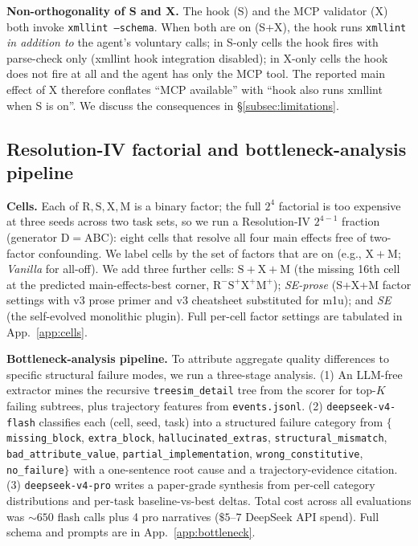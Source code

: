 \documentclass{article}
\begin{document}
\textbf{Non-orthogonality of S and X.} The hook (S) and the MCP validator (X) both invoke \texttt{xmllint --schema}. When both are on (S+X), the hook runs \texttt{xmllint} \emph{in addition to} the agent's voluntary calls; in S-only cells the hook fires with parse-check only (xmllint hook integration disabled); in X-only cells the hook does not fire at all and the agent has only the MCP tool. The reported main effect of X therefore conflates ``MCP available'' with ``hook also runs xmllint when S is on''. We discuss the consequences in \S\ref{subsec:limitations}.

\subsection{Resolution-IV factorial and bottleneck-analysis pipeline}
\label{subsec:cells}

\textbf{Cells.} Each of $\mathrm{R, S, X, M}$ is a binary factor; the full $2^4$ factorial is too expensive at three seeds across two task sets, so we run a Resolution-IV $2^{4-1}$ fraction (generator $\mathrm{D}{=}\mathrm{ABC}$): eight cells that resolve all four main effects free of two-factor confounding. We label cells by the set of factors that are on (e.g., $\mathrm{X+M}$; \emph{Vanilla} for all-off). We add three further cells: $\mathrm{S+X+M}$ (the missing 16th cell at the predicted main-effects-best corner, $\mathrm{R}^{-}\mathrm{S}^{+}\mathrm{X}^{+}\mathrm{M}^{+}$); \emph{SE-prose} (S+X+M factor settings with v3 prose primer and v3 cheatsheet substituted for m1u); and \emph{SE} (the self-evolved monolithic plugin). Full per-cell factor settings are tabulated in App.~\ref{app:cells}.

\textbf{Bottleneck-analysis pipeline.} To attribute aggregate quality differences to specific structural failure modes, we run a three-stage analysis. (1) An LLM-free extractor mines the recursive \texttt{treesim\_detail} tree from the scorer for top-$K$ failing subtrees, plus trajectory features from \texttt{events.jsonl}. (2) \texttt{deepseek-v4-flash} classifies each (cell, seed, task) into a structured failure category from $\{$\texttt{missing\_block}, \texttt{extra\_block}, \texttt{hallucinated\_extras}, \texttt{structural\_mismatch}, \texttt{bad\_attribute\_value}, \texttt{partial\_implementation}, \texttt{wrong\_constitutive}, \texttt{no\_failure}$\}$ with a one-sentence root cause and a trajectory-evidence citation. (3) \texttt{deepseek-v4-pro} writes a paper-grade synthesis from per-cell category distributions and per-task baseline-vs-best deltas. Total cost across all evaluations was ${\sim}650$ flash calls plus 4 pro narratives ($\$5\text{--}7$ DeepSeek API spend). Full schema and prompts are in App.~\ref{app:bottleneck}.
\end{document}
